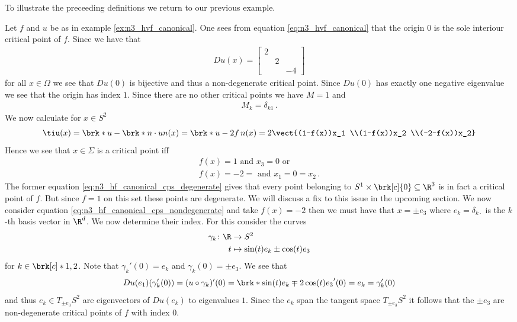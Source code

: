 To illustrate the preceeding definitions we return to our previous example.
\begin{example}
  Let $f$ and $u$ be as in example \ref{ex:n3_hvf_canonical}. One sees from equation \eqref{eq:n3_hvf_canonical}
  that the origin $0$ is the sole interiour critical point of $f$. Since we have that
  \begin{align*}
    Du(x) = \begin{bmatrix}
      2 & & \\
       & 2 & \\
      & & -4
    \end{bmatrix}
  \end{align*}
  for all $x\in\Omega$ we see that $Du(0)$ is bijective and thus a non-degenerate critical point. Since $Du(0)$ has
  exactly one negative eigenvalue we see that the origin has index $1$. Since there are no other critical points we have
  $M=1$ and
  \begin{align*}
    M_k=\delta_{k1}\,.
  \end{align*}
  We now calculate for $x\in S^2$
  \begin{align*}
    \tiu(x) = \brk*{u-\brk*{n\cdot u}n}(x)
    = \brk*{u-2f\,n}(x)
    = 2\vect{(1-f(x))x_1 \\(1-f(x))x_2 \\(-2-f(x))x_2}
  \end{align*}
  Hence we see that $x\in\Sigma$ is a critical point iff 
  \begin{align}
    f(x)=1 \text{ and }x_3=0\text{ or } \label{eq:n3_hf_canonical_cps_degenerate} \\
    f(x)=-2 = \text{ and }x_1=0=x_2\,. \label{eq:n3_hf_canonical_cps_nondegenerate}
  \end{align}
  The former equation \eqref{eq:n3_hf_canonical_cps_degenerate} gives that every
  point belonging to $S^1\times\brk[c]{0}\subseteq\R^3$ is in fact a critical point of $f$.
  But since $f=1$ on this set these points are degenerate.
  We will discuss a fix to this issue in the upcoming section.
  We now consider equation \eqref{eq:n3_hf_canonical_cps_nondegenerate} and take 
   $f(x)=-2$ then we must have that $x=\pm e_3$ where $e_k=\delta_{k\cdot}$
  is the $k$-th basis vector in $\R^d$. We now determine their index. For this consider the curves
  \begin{align*}
    \gamma_k\colon\R&\to S^2\\
    t&\mapsto \sin(t)e_k\pm\cos(t)e_3
  \end{align*}
  for $k\in\brk[c]*{1,2}$.
  Note that $\gamma_k'(0)=e_k$ and $\gamma_k(0)=\pm e_3$.
  We see that
  \begin{align*}
    Du(e_1)(\gamma_k'(0))=(u\circ\gamma_k)'(0)
    =\brk*{\sin(t)e_k\mp2\cos(t)e_3}'(0)
    =e_k=\gamma_k'(0)
  \end{align*}
  and thus $e_k\in T_{\pm e_3}S^2$ are eigenvectors of $Du(e_k)$ to eigenvalues $1$.
  Since the $e_k$ span the tangent space $T_{\pm e_3}S^2$ it follows that
  the $\pm e_3$ are non-degenerate critical points of $f$ with index $0$.
\end{example}

